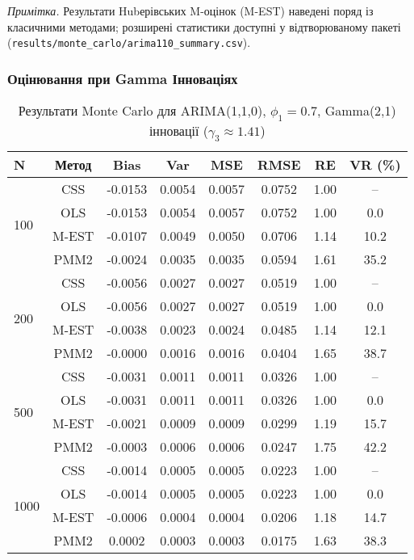 \documentclass[12pt,a4paper]{article}
\begin{document}
\noindent\textit{Примітка.} Результати Hubерівських M-оцінок (M-EST) наведені поряд із класичними методами; розширені статистики доступні у відтворюваному пакеті (\texttt{results/monte\_carlo/arima110\_summary.csv}).

\subsubsection{Оцінювання при Gamma Інноваціях}

\begin{table}[h]
\centering
\caption{Результати Monte Carlo для ARIMA(1,1,0), $\phi_1 = 0.7$, Gamma(2,1) інновації ($\gamma_3 \approx 1.41$)}
\label{tab:arima110_gamma}
\begin{tabular}{@{}lccccccc@{}}
\toprule
\textbf{N} & \textbf{Метод} & \textbf{Bias} & \textbf{Var} & \textbf{MSE} & \textbf{RMSE} & \textbf{RE} & \textbf{VR (\%)} \\
\midrule
\multirow{4}{*}{100} & CSS  & -0.0153 & 0.0054 & 0.0057 & 0.0752 & 1.00 & -- \\
                     & OLS  & -0.0153 & 0.0054 & 0.0057 & 0.0752 & 1.00 & 0.0 \\
                     & M-EST & -0.0107 & 0.0049 & 0.0050 & 0.0706 & 1.14 & 10.2 \\
                     & PMM2 & -0.0024 & 0.0035 & 0.0035 & 0.0594 & 1.61 & 35.2 \\
\midrule
\multirow{4}{*}{200} & CSS  & -0.0056 & 0.0027 & 0.0027 & 0.0519 & 1.00 & -- \\
                     & OLS  & -0.0056 & 0.0027 & 0.0027 & 0.0519 & 1.00 & 0.0 \\
                     & M-EST & -0.0038 & 0.0023 & 0.0024 & 0.0485 & 1.14 & 12.1 \\
                     & PMM2 & -0.0000 & 0.0016 & 0.0016 & 0.0404 & 1.65 & 38.7 \\
\midrule
\multirow{4}{*}{500} & CSS  & -0.0031 & 0.0011 & 0.0011 & 0.0326 & 1.00 & -- \\
                     & OLS  & -0.0031 & 0.0011 & 0.0011 & 0.0326 & 1.00 & 0.0 \\
                     & M-EST & -0.0021 & 0.0009 & 0.0009 & 0.0299 & 1.19 & 15.7 \\
                     & PMM2 & -0.0003 & 0.0006 & 0.0006 & 0.0247 & 1.75 & 42.2 \\
\midrule
\multirow{4}{*}{1000} & CSS  & -0.0014 & 0.0005 & 0.0005 & 0.0223 & 1.00 & -- \\
                      & OLS  & -0.0014 & 0.0005 & 0.0005 & 0.0223 & 1.00 & 0.0 \\
                      & M-EST & -0.0006 & 0.0004 & 0.0004 & 0.0206 & 1.18 & 14.7 \\
                      & PMM2 & 0.0002 & 0.0003 & 0.0003 & 0.0175 & 1.63 & 38.3 \\
\bottomrule
\end{tabular}
\end{table}
\end{document}
